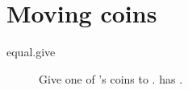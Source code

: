 \section{Moving coins}


\begin{description}
  \item[equal.give] Give one of 's coins to .  has .
\end{description}
